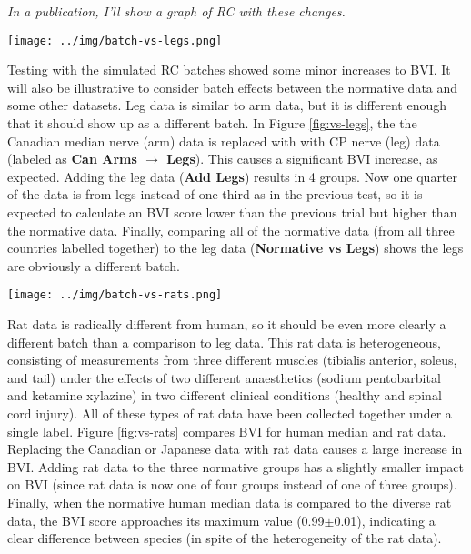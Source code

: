 \documentclass[12pt]{article}
\begin{document}
\emph{In a publication, I'll show a graph of RC with these changes.}


\pagebreak

\begin{figure*}
  \centering
       \texttt{[image: ../img/batch-vs-legs.png]}
         \caption{}
  \label{fig:vs-legs}
\end{figure*}

Testing with the simulated RC batches showed some minor increases to BVI. It will also be illustrative to consider batch effects between the normative data and some other datasets. Leg data is similar to arm data, but it is different enough that it should show up as a different batch. In Figure \ref{fig:vs-legs}, the the Canadian median nerve (arm) data is replaced with with CP nerve (leg) data (labeled as \textbf{Can Arms $\rightarrow$ Legs}). This causes a significant BVI increase, as expected. Adding the leg data (\textbf{Add Legs}) results in 4 groups. Now one quarter of the data is from legs instead of one third as in the previous test, so it is expected to calculate an BVI score lower than the previous trial but higher than the normative data. Finally, comparing all of the normative data (from all three countries labelled together) to the leg data (\textbf{Normative vs Legs}) shows the legs are obviously a different batch.

\pagebreak

\begin{figure*}
  \centering
       \texttt{[image: ../img/batch-vs-rats.png]}
         \caption{}
  \label{fig:vs-rats}
\end{figure*}

Rat data is radically different from human, so it should be even more clearly a different batch than a comparison to leg data. This rat data is heterogeneous, consisting of measurements from three different muscles (tibialis anterior, soleus, and tail) under the effects of two different anaesthetics (sodium pentobarbital and ketamine xylazine) in two different clinical conditions (healthy and spinal cord injury). All of these types of rat data have been collected together under a single label. Figure \ref{fig:vs-rats} compares BVI for human median and rat data. Replacing the Canadian or Japanese data with rat data causes a large increase in BVI. Adding rat data to the three normative groups has a slightly smaller impact on BVI (since rat data is now one of four groups instead of one of three groups). Finally, when the normative human median data is compared to the diverse rat data, the BVI score approaches its maximum value (0.99$\pm$0.01), indicating a clear difference between species (in spite of the heterogeneity of the rat data).
\end{document}
